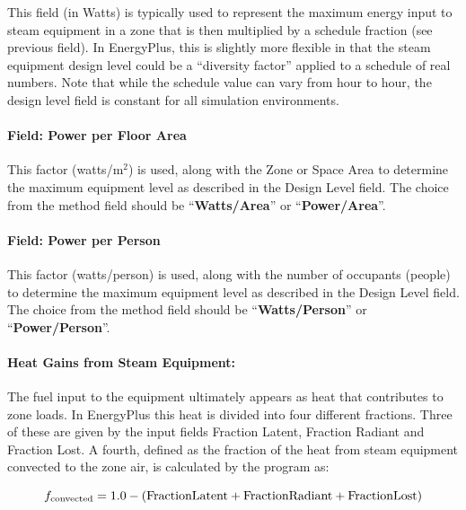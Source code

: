 This field (in Watts) is typically used to represent the maximum energy input to steam equipment in a zone that is then multiplied by a schedule fraction (see previous field). In EnergyPlus, this is slightly more flexible in that the steam equipment design level could be a ``diversity factor'' applied to a schedule of real numbers. Note that while the schedule value can vary from hour to hour, the design level field is constant for all simulation environments.

\paragraph{Field: Power per Floor Area}\label{field-power-per-zone-floor-area-2}

This factor (watts/m\(^{2}\)) is used, along with the Zone or Space Area to determine the maximum equipment level as described in the Design Level field. The choice from the method field should be ``\textbf{Watts/Area}'' or ``\textbf{Power/Area}''.

\paragraph{Field: Power per Person}\label{field-power-per-person-2}

This factor (watts/person) is used, along with the number of occupants (people) to determine the maximum equipment level as described in the Design Level field. The choice from the method field should be ``\textbf{Watts/Person}'' or ``\textbf{Power/Person}''.

\paragraph{Heat Gains from Steam Equipment:}\label{heat-gains-from-steam-equipment}

The fuel input to the equipment ultimately appears as heat that contributes to zone loads. In EnergyPlus this heat is divided into four different fractions. Three of these are given by the input fields Fraction Latent, Fraction Radiant and Fraction Lost. A fourth, defined as the fraction of the heat from steam equipment convected to the zone air, is calculated by the program as:

\begin{equation}
  f_{\rm{convected}} = 1.0 - (\rm{Fraction Latent} + \rm{Fraction Radiant} + \rm{Fraction Lost})
\end{equation}

